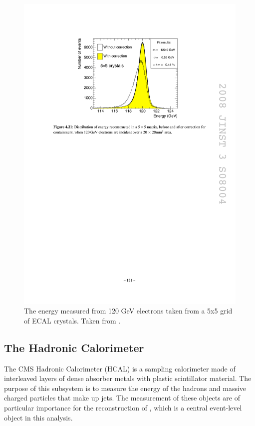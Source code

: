     \begin{figure}[h!]
      \centering
      \includegraphics[width=.7\textwidth]{figures/ecal_resolution.pdf}
      \caption{The energy measured from 120 GeV electrons taken from a 5x5 grid of ECAL crystals. Taken from \cite{cms_jinst}.}
      \label{fig:ecal_resolution}
    \end{figure}


  \subsection{The Hadronic Calorimeter}
    The CMS Hadronic Calorimeter (HCAL) is a sampling calorimeter made of interleaved layers of dense absorber metals with plastic scintillator material. The purpose of this subsystem is to measure the energy of the hadrons and massive charged particles that make up jets. The measurement of these objects are of particular importance for the reconstruction of \MET, which is a central event-level object in this analysis.

